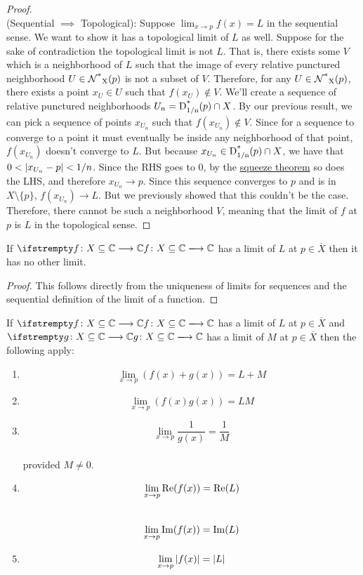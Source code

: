 \begin{proof}
\\(Sequential $\implies$ Topological): Suppose $\lim_{x \to p} f(x) = L$ in the sequential sense. We want to show it has a topological limit of $L$ as well. Suppose for the sake of contradiction the topological limit is not $L$. That is, there exists some $V$ which is a neighborhood of $L$ such that the image of every relative punctured neighborhood $U \in \rpnbhd{p}{X}$ is not a subset of $V$. Therefore, for any $U \in \rpnbhd{p}{X}$, there exists a point $x_U \in U$ such that $f(x_U) \not\in V$. We'll create a sequence of relative punctured neighborhoods $U_n = \pdisk{p}{1/n} \cap X$. By our previous result, we can pick a sequence of points $x_{U_n}$ such that $f(x_{U_n}) \not\in V$. Since for a sequence to converge to a point it must eventually be inside any neighborhood of that point, $f(x_{U_n})$ doesn't converge to $L$. But because $x_{U_n} \in \pdisk{p}{1/n} \cap X$, we have that $0 < \modulus{x_{U_n}-p} < 1/n$. Since the RHS goes to 0, by the \hyperlink{Squeeze Theorem}{squeeze theorem} so does the LHS, and therefore $x_{U_n} \to p$. Since this sequence converges to $p$ and is in $X\setminus\{p\}$, $f(x_{U_n}) \to L$. But we previously showed that this couldn't be the case. Therefore, there cannot be such a neighborhood $V$, meaning that the limit of $f$ at $p$ is $L$ in the topological sense. 
\end{proof}
\begin{theorem}
If $\fn{f}{X\subseteq\mathbb{C}}{\mathbb{C}}$ has a limit of $L$ at $p \in \overline{X}$ then it has no other limit.
\end{theorem}
\begin{proof}
This follows directly from the uniqueness of limits for sequences and the sequential definition of the limit of a function.
\end{proof}
\begin{theorem}
If $\fn{f}{X\subseteq\mathbb{C}}{\mathbb{C}}$ has a limit of $L$ at $p \in \overline{X}$ and $\fn{g}{X\subseteq\mathbb{C}}{\mathbb{C}}$ has a limit of $M$ at $p \in \overline{X}$ then the following apply:
\begin{enumerate}
\item $$\lim_{x \to p} (f(x)+g(x)) = L+M$$
\item $$\lim_{x \to p} (f(x)g(x)) = LM$$
\item $$\lim_{x \to p} \frac{1}{g(x)} = \frac{1}{M}$$\\
provided $M \neq 0$.
\item $$\lim_{x \to p} \rpart{f(x)} = \rpart{L}$$\\$$\lim_{x \to p} \ipart{f(x)} = \ipart{L}$$
\item $$\lim_{x \to p} \modulus{f(x)} = \modulus{L}$$
\end{enumerate}
\end{theorem}
